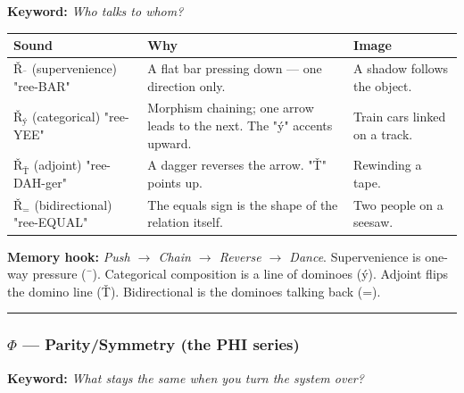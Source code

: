 \documentclass[12pt,a4paper]{article}
\begin{document}
\textbf{Keyword:} \emph{Who talks to whom?}

\begin{table}[htbp]
\centering
\small
{}
\begin{tabularx}{\textwidth}{>{\centering\arraybackslash}X >{\centering\arraybackslash}X >{\centering\arraybackslash}X}
\toprule
\rowcolor{gray!25}\textbf{Sound} & \textbf{Why} & \textbf{Image} \\
\midrule
\rowcolors{1}{white}{gray!10}
\textbf{$Ř_{\text{¯}}$} (supervenience) "ree-BAR" & A flat bar pressing down --- one direction only. & A shadow follows the object. \\
\textbf{$Ř_{\text{ý}}$} (categorical) "ree-YEE" & Morphism chaining; one arrow leads to the next. The "ý" accents upward. & Train cars linked on a track. \\
\textbf{$Ř_{\text{Ť}}$} (adjoint) "ree-DAH-ger" & A dagger reverses the arrow. "Ť" points up. & Rewinding a tape. \\
\textbf{$Ř_{=}$} (bidirectional) "ree-EQUAL" & The equals sign is the shape of the relation itself. & Two people on a seesaw. \\
\bottomrule
\end{tabularx}
\end{table}

\textbf{Memory hook:} \emph{Push $\rightarrow$ Chain $\rightarrow$ Reverse $\rightarrow$ Dance}. Supervenience is one-way pressure (¯). Categorical composition is a line of dominoes (ý). Adjoint flips the domino line (Ť). Bidirectional is the dominoes talking back (=).

\begin{center}
\rule{0.5\textwidth}{0.4pt}
\end{center}

\subsubsection{$\Phi$ --- Parity/Symmetry (the \textbf{PHI} series)}

\textbf{Keyword:} \emph{What stays the same when you turn the system over?}
\end{document}

